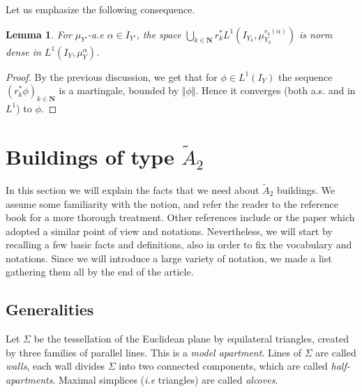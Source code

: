 \documentclass[a4paper, 11pt]{article}
\theoremstyle{plain}
\newtheorem{lemma}[proposition]{Lemma}
\theoremstyle{definition}
\theoremstyle{remark}
\DeclareMathOperator{\Isom}{Isom}
\newcommand{\NN}{\mathbf{N}}                          %
\begin{document}
Let us emphasize the following consequence.

\begin{lemma}\label{lem:densityL1_gen}
%
For $\mu_{Y'}$-a.e $\alpha\in I_{Y'}$, the space $\bigcup_{k\in \NN} r_k^*L^1(I_{Y_k},\mu_{Y_k}^{r_k(\alpha)})$ is norm dense in $L^1(I_Y,\mu_Y^\alpha)$.
\end{lemma}

\begin{proof}
By the previous discussion, we get that for $\phi\in L^1(I_Y)$ the sequence $(r_k^*\phi)_{k\in\NN}$ is a martingale, bounded by $\Vert \phi\Vert$. Hence it converges (both a.s. and in $L^1$) to $\phi$.

\end{proof}

\section{Buildings of type $\tilde A_2$}\label{sec:buildings}


In this section we will explain the facts that we need about $\tilde A_2$ buildings.
 We assume some familiarity with the notion, and refer the reader to the reference book \cite{AbramenkoBrown} for a more thorough treatment. 
 Other references include \cite{WeissBook} or the paper \cite{BCL} which adopted a similar point of view and notations.
 Nevertheless, we will start by recalling a few basic facts and definitions, also in order to fix the vocabulary and notations. 
 Since we will introduce a large variety of notation, we made a list gathering them all by the end of the article. 

\subsection{Generalities}

Let $\Sigma$ be the tessellation of the Euclidean plane by equilateral triangles, created by three families of parallel lines. 
This is a \emph{model apartment}. Lines of $\Sigma$ are called \emph{walls}, each wall divides $\Sigma$ into two connected components, which are called \emph{half-apartments}.
Maximal simplices (\textit{i.e} triangles) are called \emph{alcoves}. 
\end{document}
